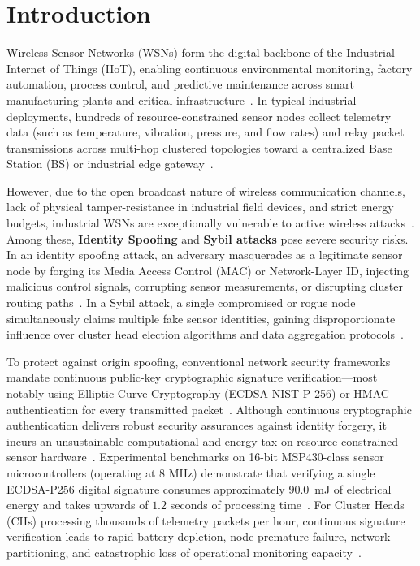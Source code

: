 \documentclass[journal]{IEEEtran}
\begin{document}
\section{Introduction}
Wireless Sensor Networks (WSNs) form the digital backbone of the Industrial Internet of Things (IIoT), enabling continuous environmental monitoring, factory automation, process control, and predictive maintenance across smart manufacturing plants and critical infrastructure~\cite{ref_iot_survey_01, ref_wsn_ind_02}. In typical industrial deployments, hundreds of resource-constrained sensor nodes collect telemetry data (such as temperature, vibration, pressure, and flow rates) and relay packet transmissions across multi-hop clustered topologies toward a centralized Base Station (BS) or industrial edge gateway~\cite{ref_cluster_03, ref_iiot_sec_04}.

However, due to the open broadcast nature of wireless communication channels, lack of physical tamper-resistance in industrial field devices, and strict energy budgets, industrial WSNs are exceptionally vulnerable to active wireless attacks~\cite{ref_phy_sec_05, ref_wsn_threats_06}. Among these, \textbf{Identity Spoofing} and \textbf{Sybil attacks} pose severe security risks. In an identity spoofing attack, an adversary masquerades as a legitimate sensor node by forging its Media Access Control (MAC) or Network-Layer ID, injecting malicious control signals, corrupting sensor measurements, or disrupting cluster routing paths~\cite{ref_spoof_survey_07, ref_sybil_08}. In a Sybil attack, a single compromised or rogue node simultaneously claims multiple fake sensor identities, gaining disproportionate influence over cluster head election algorithms and data aggregation protocols~\cite{ref_sybil_wsn_09}.

To protect against origin spoofing, conventional network security frameworks mandate continuous public-key cryptographic signature verification---most notably using Elliptic Curve Cryptography (ECDSA NIST P-256) or HMAC authentication for every transmitted packet~\cite{ref_ecc_wsn_10, ref_crypto_cost_11}. Although continuous cryptographic authentication delivers robust security assurances against identity forgery, it incurs an unsustainable computational and energy tax on resource-constrained sensor hardware~\cite{ref_mcu_energy_12}. Experimental benchmarks on 16-bit MSP430-class sensor microcontrollers (operating at 8 MHz) demonstrate that verifying a single ECDSA-P256 digital signature consumes approximately $90.0$~mJ of electrical energy and takes upwards of $1.2$ seconds of processing time~\cite{ref_ecdsa_bench_13, ref_msp430_bench_14}. For Cluster Heads (CHs) processing thousands of telemetry packets per hour, continuous signature verification leads to rapid battery depletion, node premature failure, network partitioning, and catastrophic loss of operational monitoring capacity~\cite{ref_ch_depletion_15}.
\end{document}
